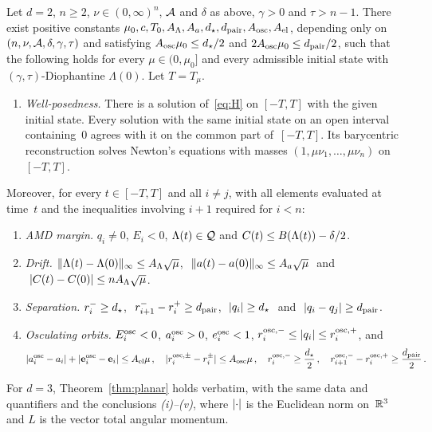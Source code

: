 \begin{theorem}\label{thm:planar}
Let $d=2$, $n\geq 2$, $\nu\in(0,\infty)^n$, $\mathcal{A}$ and $\delta$ as above, $\gamma>0$ and $\tau>n-1$. There exist positive constants $\mu_0,c,T_0,A_\Lambda,A_a,d_\star,d_{\mathrm{pair}},A_{\mathrm{osc}},A_{\mathrm{el}}$, depending only on $(n,\nu,\mathcal{A},\delta,\gamma,\tau)$ and satisfying $A_{\mathrm{osc}}\mu_0\leq d_\star/2$ and $2A_{\mathrm{osc}}\mu_0\leq d_{\mathrm{pair}}/2$, such that the following holds for every $\mu\in(0,\mu_0]$ and every admissible initial state with $(\gamma,\tau)$-Diophantine $\Lambda(0)$. Let $T=T_\mu$.
\begin{enumerate}[label=(\roman*)]
\item \emph{Well-posedness.} There is a solution of~\eqref{eq:H} on $[-T,T]$ with the given initial state. Every solution with the same initial state on an open interval containing~$0$ agrees with it on the common part of~$[-T,T]$. Its barycentric reconstruction solves Newton's equations with masses $(1,\mu\nu_1,\ldots,\mu\nu_n)$ on $[-T,T]$.
\end{enumerate}
Moreover, for every $t\in[-T,T]$ and all $i\neq j$, with all elements evaluated at time~$t$ and the inequalities involving $i+1$ required for $i<n$:
\begin{enumerate}[label=(\roman*),resume]
\item \emph{AMD margin.} $q_i\neq0$, $E_i<0$, $\Lambda(t)\in\mathcal{Q}$ and $C(t)\leq B(\Lambda(t))-\delta/2$.
\item \emph{Drift.} $\lVert \Lambda(t)-\Lambda(0)\rVert_\infty\leq A_\Lambda\sqrt\mu$, $\ \nrm{a(t)-a(0)}\leq A_a\sqrt\mu\ $ and $\ \lvert C(t)-C(0)\rvert\leq nA_\Lambda\sqrt\mu$.
\item \emph{Separation.} $r_i^-\geq d_\star$, $\ r_{i+1}^--r_i^+\geq d_{\mathrm{pair}}$, $\ \lvert q_i\rvert\geq d_\star\ $ and $\ \lvert q_i-q_j\rvert\geq d_{\mathrm{pair}}$.
\item \emph{Osculating orbits.} $E_i^{\mathrm{osc}}<0$, $a_i^{\mathrm{osc}}>0$, $e_i^{\mathrm{osc}}<1$, $r_i^{\mathrm{osc},-}\leq\lvert q_i\rvert\leq r_i^{\mathrm{osc},+}$, and
\begin{equation*}
\lvert a_i^{\mathrm{osc}}-a_i\rvert+\lvert \mathbf{e}_i^{\mathrm{osc}}-\mathbf{e}_i\rvert\leq A_{\mathrm{el}}\mu\,,\quad \lvert r_i^{\mathrm{osc},\pm}-r_i^\pm\rvert\leq A_{\mathrm{osc}}\mu\,,\quad r_i^{\mathrm{osc},-}\geq\frac{d_\star}{2}\,,\quad r_{i+1}^{\mathrm{osc},-}-r_i^{\mathrm{osc},+}\geq\frac{d_{\mathrm{pair}}}{2}\,.
\end{equation*}
\end{enumerate}
\end{theorem}

\begin{theorem}\label{thm:spatial}
For $d=3$, Theorem~\ref{thm:planar} holds verbatim, with the same data and quantifiers and the conclusions \emph{(i)--(v)}, where $\lvert \cdot\rvert$ is the Euclidean norm on~$\mathbb{R}^3$ and $L$ is the vector total angular momentum.
\end{theorem}

